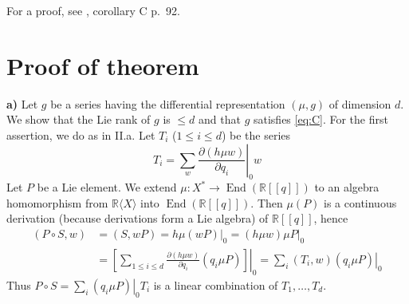 \documentclass[a4paper,12pt]{article}
\newcommand{\End}{\operatorname{End}}
\newcommand{\R}{\mathbb{R}}
\newcommand{\Rx}{\R\langle X\rangle}
\begin{document}

For a proof, see \cite{8}, corollary C p.\ 92.

\section{Proof of theorem}

\textbf{a)} Let $g$ be a series having the differential representation $(\mu,g)$ of dimension $d$. We show that the Lie rank of $g$ is $\leq d$ and that $g$ satisfies \eqref{eq:C}. For the first assertion, we do as in \cite{5} II.a. Let $T_i$ ($1 \leq i \leq d$) be the series
\begin{equation*}
	{T}_{{i}}=\left.\sum_{{w}} \frac{\partial({h} \mu {w})}{\partial {q}_{{i}}}\right|_{0} {w}
\end{equation*}
Let ${P}$ be a Lie element. We extend $\mu: X^* \to \End(\R[[q]])$ to an algebra homomorphism from $\Rx$ into $\End(\R[[q]])$. Then $\mu(P)$ is a continuous derivation (because derivations form a Lie algebra) of $\R[[q]]$, hence
\begin{equation*}
	\begin{split}
		(P \circ S, w)&=(S, w P)=\left.h \mu(w P)\right|_0=\left.(h \mu w) \mu P\right|_0 \\
		& =\left.\left[\sum_{1 \leq i \leq d} \frac{\partial(h \mu w)}{\partial q_i}\left(q_i \mu P\right)\right]\right|_0=\left.\sum_i\left(T_i, w\right)\left(q_i \mu P\right)\right|_0
	\end{split}
\end{equation*}
Thus ${P} \circ {S}=\left.\sum_i\left({q}_i \mu {P}\right)\right|_{0} {T}_i$ is a linear combination of ${T}_1, \ldots, {T}_{{d}}$.
\end{document}
